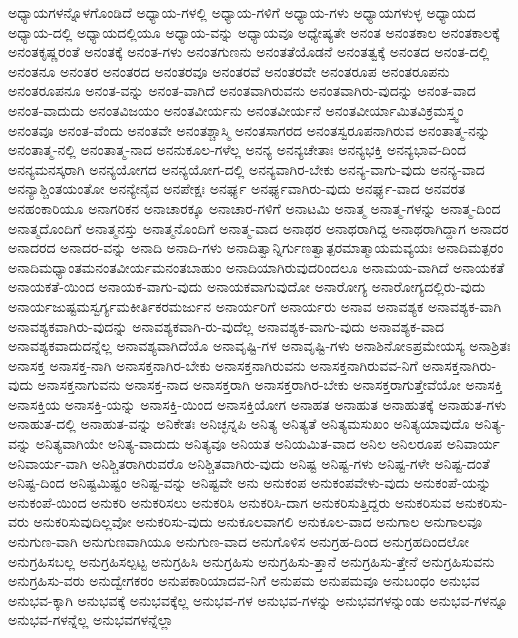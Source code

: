 {ಅಧ್ಯಾಯಗಳನ್ನೊಳಗೊಂಡಿದೆ
ಅಧ್ಯಾಯ-ಗಳಲ್ಲಿ
ಅಧ್ಯಾಯ-ಗಳಿಗೆ
ಅಧ್ಯಾಯ-ಗಳು
ಅಧ್ಯಾಯಗಳುಳ್ಳ
ಅಧ್ಯಾಯದ
ಅಧ್ಯಾಯ-ದಲ್ಲಿ
ಅಧ್ಯಾಯದಲ್ಲಿಯೂ
ಅಧ್ಯಾಯ-ವನ್ನು
ಅಧ್ಯಾಯವೂ
ಅಧ್ಯೇಷ್ಯತೇ
ಅನಂತ
ಅನಂತಕಾಲ
ಅನಂತಕಾಲಕ್ಕೆ
ಅನಂತಕೃಷ್ಣರಂತೆ
ಅನಂತಕ್ಕೆ
ಅನಂತ-ಗಳು
ಅನಂತಗುಣನು
ಅನಂತತೆಯೊಡನೆ
ಅನಂತತ್ವಕ್ಕೆ
ಅನಂತದ
ಅನಂತ-ದಲ್ಲಿ
ಅನಂತನೂ
ಅನಂತರ
ಅನಂತರದ
ಅನಂತರವೂ
ಅನಂತರವೆ
ಅನಂತರವೇ
ಅನಂತರೂಪ
ಅನಂತರೂಪನು
ಅನಂತರೂಪನೂ
ಅನಂತ-ವನ್ನು
ಅನಂತ-ವಾಗಿದೆ
ಅನಂತವಾಗಿರುವನು
ಅನಂತವಾಗಿರು-ವುದನ್ನು
ಅನಂತ-ವಾದ
ಅನಂತ-ವಾದುದು
ಅನಂತವಿಜಯಂ
ಅನಂತವೀರ್ಯನು
ಅನಂತವೀರ್ಯನೆ
ಅನಂತವೀರ್ಯಾಮಿತವಿಕ್ರಮಸ್ತ್ವಂ
ಅನಂತವೂ
ಅನಂತ-ವೆಂದು
ಅನಂತವೇ
ಅನಂತಶ್ಚಾಸ್ಮಿ
ಅನಂತಸಾಗರದ
ಅನಂತಸ್ವರೂಪನಾಗಿರುವ
ಅನಂತಾತ್ಮ-ನನ್ನು
ಅನಂತಾತ್ಮ-ನಲ್ಲಿ
ಅನಂತಾತ್ಮ-ನಾದ
ಅನನುಕೂಲ-ಗಳೆಲ್ಲ
ಅನನ್ಯ
ಅನನ್ಯಚೇತಾಃ
ಅನನ್ಯಭಕ್ತಿ
ಅನನ್ಯಭಾವ-ದಿಂದ
ಅನನ್ಯಮನಸ್ಕರಾಗಿ
ಅನನ್ಯಯೋಗದ
ಅನನ್ಯಯೋಗ-ದಲ್ಲಿ
ಅನನ್ಯವಾಗಿರ-ಬೇಕು
ಅನನ್ಯ-ವಾಗು-ವುದು
ಅನನ್ಯ-ವಾದ
ಅನನ್ಯಾಶ್ಚಿಂತಯಂತೋ
ಅನನ್ಯೇನೈವ
ಅನಪೇಕ್ಷಃ
ಅನರ್ಘ್ಯ
ಅನರ್ಘ್ಯವಾಗಿರು-ವುದು
ಅನರ್ಘ್ಯ-ವಾದ
ಅನವರತ
ಅನಹಂಕಾರಿಯೂ
ಅನಾಗರಿಕನ
ಅನಾಚಾರಕ್ಕೂ
ಅನಾಚಾರ-ಗಳಿಗೆ
ಅನಾಟಮಿ
ಅನಾತ್ಮ
ಅನಾತ್ಮ-ಗಳನ್ನು
ಅನಾತ್ಮ-ದಿಂದ
ಅನಾತ್ಮದೊಂದಿಗೆ
ಅನಾತ್ಮನಸ್ತು
ಅನಾತ್ಮನೊಂದಿಗೆ
ಅನಾತ್ಮ-ವಾದ
ಅನಾಥರ
ಅನಾಥರಾಗಿದ್ದ
ಅನಾಥರಾಗಿದ್ದಾಗ
ಅನಾದರ
ಅನಾದರದ
ಅನಾದರ-ವನ್ನು
ಅನಾದಿ
ಅನಾದಿ-ಗಳು
ಅನಾದಿತ್ವಾನ್ನಿರ್ಗುಣತ್ವಾತ್ಪರಮಾತ್ಮಾಯಮವ್ಯಯಃ
ಅನಾದಿಮತ್ಪರಂ
ಅನಾದಿಮಧ್ಯಾಂತಮನಂತವೀರ್ಯಮನಂತಬಾಹುಂ
ಅನಾದಿಯಾಗಿರುವುದರಿಂದಲೂ
ಅನಾಮಯ-ವಾಗಿದೆ
ಅನಾಯಕತೆ
ಅನಾಯಕತೆ-ಯಿಂದ
ಅನಾಯಕ-ವಾಗು-ವುದು
ಅನಾಯಕವಾಗುವುದೋ
ಅನಾರೋಗ್ಯ
ಅನಾರೋಗ್ಯದಲ್ಲಿರು-ವುದು
ಅನಾರ್ಯಜುಷ್ಟಮಸ್ವರ್ಗ್ಯಮಕೀರ್ತಿಕರಮರ್ಜುನ
ಅನಾರ್ಯರಿಗೆ
ಅನಾರ್ಯರು
ಅನಾವ
ಅನಾವಶ್ಯಕ
ಅನಾವಶ್ಯಕ-ವಾಗಿ
ಅನಾವಶ್ಯಕವಾಗಿರು-ವುದನ್ನು
ಅನಾವಶ್ಯಕವಾಗಿ-ರು-ವುದೆಲ್ಲ
ಅನಾವಶ್ಯಕ-ವಾಗು-ವುದು
ಅನಾವಶ್ಯಕ-ವಾದ
ಅನಾವಶ್ಯಕವಾದುದನ್ನೆಲ್ಲ
ಅನಾವಶ್ಯವಾಗಿದೆಯೊ
ಅನಾವೃಷ್ಟಿ-ಗಳ
ಅನಾವೃಷ್ಟಿ-ಗಳು
ಅನಾಶಿನೋಽಪ್ರಮೇಯಸ್ಯ
ಅನಾಶ್ರಿತಃ
ಅನಾಸಕ್ತ
ಅನಾಸಕ್ತ-ನಾಗಿ
ಅನಾಸಕ್ತನಾಗಿರ-ಬೇಕು
ಅನಾಸಕ್ತನಾಗಿರುವನು
ಅನಾಸಕ್ತನಾಗಿರುವವ-ನಿಗೆ
ಅನಾಸಕ್ತನಾಗಿರು-ವುದು
ಅನಾಸಕ್ತನಾಗುವನು
ಅನಾಸಕ್ತ-ನಾದ
ಅನಾಸಕ್ತರಾಗಿ
ಅನಾಸಕ್ತರಾಗಿರ-ಬೇಕು
ಅನಾಸಕ್ತರಾಗುತ್ತೇವೆಯೋ
ಅನಾಸಕ್ತಿ
ಅನಾಸಕ್ತಿಯ
ಅನಾಸಕ್ತಿ-ಯನ್ನು
ಅನಾಸಕ್ತಿ-ಯಿಂದ
ಅನಾಸಕ್ತಿಯೋಗ
ಅನಾಹತ
ಅನಾಹುತ
ಅನಾಹುತಕ್ಕೆ
ಅನಾಹುತ-ಗಳು
ಅನಾಹುತ-ದಲ್ಲಿ
ಅನಾಹುತ-ವನ್ನು
ಅನಿಕೇತಃ
ಅನಿಚ್ಛನ್ನಪಿ
ಅನಿತ್ಯ
ಅನಿತ್ಯತೆ
ಅನಿತ್ಯಮಸುಖಂ
ಅನಿತ್ಯಯಾವುದೊ
ಅನಿತ್ಯ-ವನ್ನು
ಅನಿತ್ಯವಾಗಿಯೇ
ಅನಿತ್ಯ-ವಾದುದು
ಅನಿತ್ಯವೂ
ಅನಿಯತ
ಅನಿಯಮಿತ-ವಾದ
ಅನಿಲ
ಅನಿಲರೂಪ
ಅನಿವಾರ್ಯ
ಅನಿವಾರ್ಯ-ವಾಗಿ
ಅನಿಶ್ಚಿತರಾಗಿರುವರೊ
ಅನಿಶ್ಚಿತವಾಗಿರು-ವುದು
ಅನಿಷ್ಟ
ಅನಿಷ್ಟ-ಗಳು
ಅನಿಷ್ಟ-ಗಳೇ
ಅನಿಷ್ಟ-ದಂತೆ
ಅನಿಷ್ಟ-ದಿಂದ
ಅನಿಷ್ಟಮಿಷ್ಟಂ
ಅನಿಷ್ಟ-ವನ್ನು
ಅನಿಷ್ಟವೇ
ಅನು
ಅನುಕಂಪ
ಅನುಕಂಪವೇಳು-ವುದು
ಅನುಕಂಪೆ-ಯನ್ನು
ಅನುಕಂಪೆ-ಯಿಂದ
ಅನುಕರಿ
ಅನುಕರಿಸಲು
ಅನುಕರಿಸಿ
ಅನುಕರಿಸಿ-ದಾಗ
ಅನುಕರಿಸುತ್ತಿದ್ದರು
ಅನುಕರಿಸುವ
ಅನುಕರಿಸು-ವರು
ಅನುಕರಿಸುವುದಿಲ್ಲವೋ
ಅನುಕರಿಸು-ವುದು
ಅನುಕೂಲವಾಗಲಿ
ಅನುಕೂಲ-ವಾದ
ಅನುಗಾಲ
ಅನುಗಾಲವೂ
ಅನುಗುಣ-ವಾಗಿ
ಅನುಗುಣವಾಗಿಯೂ
ಅನುಗುಣ-ವಾದ
ಅನುಗೊಳಿಸ
ಅನುಗ್ರಹ-ದಿಂದ
ಅನುಗ್ರಹದಿಂದಲೋ
ಅನುಗ್ರಹಿಸಬಲ್ಲ
ಅನುಗ್ರಹಿಸಲ್ಪಟ್ಟ
ಅನುಗ್ರಹಿಸಿ
ಅನುಗ್ರಹಿಸು
ಅನುಗ್ರಹಿಸು-ತ್ತಾನೆ
ಅನುಗ್ರಹಿಸು-ತ್ತೇನೆ
ಅನುಗ್ರಹಿಸುವನು
ಅನುಗ್ರಹಿಸು-ವರು
ಅನುದ್ವೇಗಕರಂ
ಅನುಪಕಾರಿಯಾದವ-ನಿಗೆ
ಅನುಪಮ
ಅನುಪಮವೂ
ಅನುಬಂಧಂ
ಅನುಭವ
ಅನುಭವ-ಕ್ಕಾಗಿ
ಅನುಭವಕ್ಕೆ
ಅನುಭವಕ್ಕೆಲ್ಲ
ಅನುಭವ-ಗಳ
ಅನುಭವ-ಗಳನ್ನು
ಅನುಭವಗಳನ್ನುಂಡು
ಅನುಭವ-ಗಳನ್ನೂ
ಅನುಭವ-ಗಳನ್ನೆಲ್ಲ
ಅನುಭವಗಳನ್ನೆಲ್ಲಾ
}
